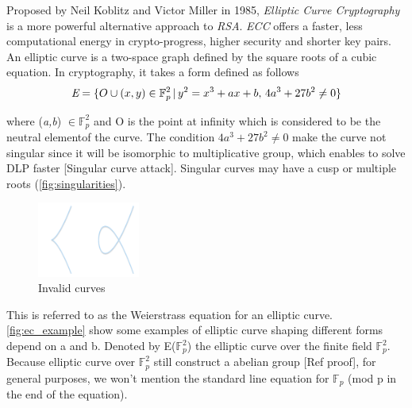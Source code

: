 Proposed by Neil Koblitz and Victor Miller in 1985, \emph{Elliptic Curve Cryptography} is a more powerful alternative approach to \emph{RSA}. \emph{ECC} offers a faster, less computational energy in crypto-progress, higher security and shorter key pairs. 
An elliptic curve is a two-space graph defined by the square roots of a cubic equation. In cryptography, it takes a form defined as follows
\begin{equation} 
	\emph{E} = \{{O}\cup{(x,y)\in \mathbb{F}_{p}^2 \,|\, y^2 = x^3 + ax + b, \, 4a^3 + 27b^2 \neq 0}\}
\end{equation}

where (\emph{a,b}) $\in\mathbb{F}_{p}^2$ and O is the point at infinity which is considered to be the neutral elementof the curve.
The condition $4a^3 + 27b^2 \neq 0$ make the curve not singular since it will be isomorphic to multiplicative group, which enables to solve DLP faster [Singular curve attack].
Singular curves may have a cusp or multiple roots (\autoref{fig:singularities}).

\begin{figure}[h!]
	\centering
	\includegraphics[width=0.3\textwidth]{images/singularities.png}
	\caption[Invalid curves]{Invalid curves}
	\label{fig:singularities}
\end{figure}

This is referred to as the Weierstrass equation for an elliptic curve.
\autoref{fig:ec_example} show some examples of elliptic curve shaping different forms depend on a and b.
Denoted by E($\mathbb{F}_{p}^2$) the elliptic curve over the finite field $\mathbb{F}_{p}^2$. 
Because elliptic curve over $\mathbb{F}_{p}^2$ still construct a abelian group [Ref proof], for general purposes, we won't mention the standard line equation for $\mathbb{F}_{p}$ (mod p in the end of the equation). 


